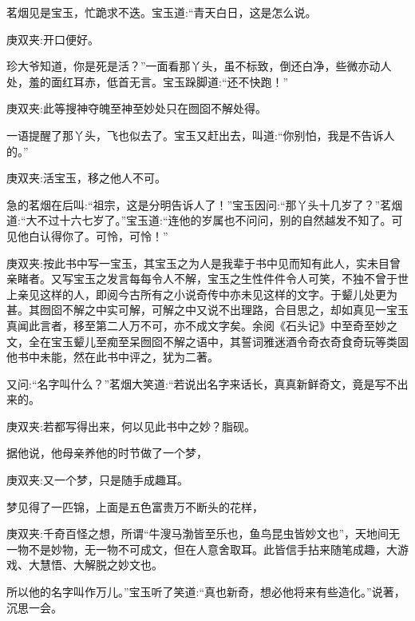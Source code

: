 \begin{parag}
    茗烟见是宝玉，忙跪求不迭。宝玉道:“青天白日，这是怎么说。\begin{note}庚双夹:开口便好。\end{note}珍大爷知道，你是死是活？”一面看那丫头，虽不标致，倒还白净，些微亦动人处，羞的面红耳赤，低首无言。宝玉跺脚道:“还不快跑！”\begin{note}庚双夹:此等搜神夺魄至神至妙处只在囫囵不解处得。\end{note}一语提醒了那丫头，飞也似去了。宝玉又赶出去，叫道:“你别怕，我是不告诉人的。”\begin{note}庚双夹:活宝玉，移之他人不可。\end{note}急的茗烟在后叫:“祖宗，这是分明告诉人了！”宝玉因问:“那丫头十几岁了？”茗烟道:“大不过十六七岁了。”宝玉道:“连他的岁属也不问问，别的自然越发不知了。可见他白认得你了。可怜，可怜！”\begin{note}庚双夹:按此书中写一宝玉，其宝玉之为人是我辈于书中见而知有此人，实未目曾亲睹者。又写宝玉之发言每每令人不解，宝玉之生性件件令人可笑，不独不曾于世上亲见这样的人，即阅今古所有之小说奇传中亦未见这样的文字。于颦儿处更为甚。其囫囵不解之中实可解，可解之中又说不出理路，合目思之，却如真见一宝玉真闻此言者，移至第二人万不可，亦不成文字矣。余阅《石头记》中至奇至妙之文，全在宝玉颦儿至痴至呆囫囵不解之语中，其誓词雅迷酒令奇衣奇食奇玩等类固他书中未能，然在此书中评之，犹为二著。\end{note}又问:“名字叫什么？”茗烟大笑道:“若说出名字来话长，真真新鲜奇文，竟是写不出来的。\begin{note}庚双夹:若都写得出来，何以见此书中之妙？脂砚。\end{note}据他说，他母亲养他的时节做了一个梦，\begin{note}庚双夹:又一个梦，只是随手成趣耳。\end{note}梦见得了一匹锦，上面是五色富贵万不断头的花样，\begin{note}庚双夹:千奇百怪之想，所谓“牛溲马渤皆至乐也，鱼鸟昆虫皆妙文也”，天地间无一物不是妙物，无一物不可成文，但在人意舍取耳。此皆信手拈来随笔成趣，大游戏、大慧悟、大解脱之妙文也。\end{note}所以他的名字叫作万儿。”宝玉听了笑道:“真也新奇，想必他将来有些造化。”说著，沉思一会。
\end{parag}


